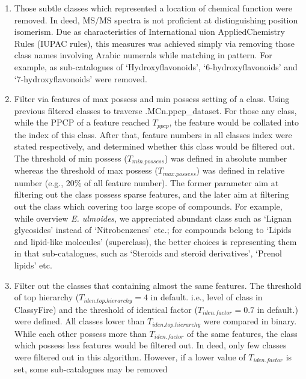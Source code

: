 \begin{itemize}
  \begin{enumerate}
  \def\labelenumi{\arabic{enumi}.}
  \tightlist
  \item
    Those subtle classes which represented a location of chemical
    function were removed. In deed, MS/MS spectra is not proficient at
    distinguishing position isomerism. Due as characteristics of
    International uion AppliedChemistry Rules (IUPAC rules), this
    measures was achieved simply via removing those class names
    involving Arabic numerals while matching in pattern. For example, as
    sub-catalogues of `Hydroxyflavonoids', `6-hydroxyflavonoids' and
    `7-hydroxyflavonoids' were removed.
  \item
    Filter via features of max possess and min possess setting of a
    class. Using previous filtered classes to traverse
    .MCn.ppcp\_dataset. For those any class, while the PPCP of a feature
    reached \(T_{ppcp}\), the feature would be collated into the index
    of this class. After that, feature numbers in all classes index were
    stated respectively, and determined whether this class would be
    filtered out. The threshold of min possess (\(T_{min.possess}\)) was
    defined in absolute number whereas the threshold of max possess
    (\(T_{max.possess}\)) was defined in relative number (e.g., 20\% of
    all feature number). The former parameter aim at filtering out the
    class possess sparse features, and the later aim at filtering out
    the class which covering too large scope of compounds. For example,
    while overview \emph{E. ulmoides}, we appreciated abundant class
    such as `Lignan glycosides' instead of `Nitrobenzenes' etc.; for
    compounds belong to `Lipids and lipid-like molecules' (superclass),
    the better choices is representing them in that sub-catalogues, such
    as `Steroids and steroid derivatives', `Prenol lipids' etc.
  \item
    Filter out the classes that containing almost the same features. The
    threshold of top hierarchy (\(T_{iden.top.hierarchy} = 4\) in
    default. i.e., level of class in ClassyFire) and the threshold of
    identical factor (\(T_{iden.factor} = 0.7\) in default.) were
    defined. All classes lower than \(T_{iden.top.hierarchy}\) were
    compared in binary. While each other possess more than
    \(T_{iden.factor}\) of the same features, the class which possess
    less features would be filtered out. In deed, only few classes were
    filtered out in this algorithm. However, if a lower value of
    \(T_{iden.factor}\) is set, some sub-catalogues may be removed

\end{enumerate}
\end{itemize}
